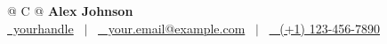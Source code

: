 
\begin{tabularx}{\linewidth}{@{} C @{}}
{\fontsize{32}{38}\selectfont\color{primary}\textbf{Alex Johnson}} \\[10pt]
\href{https://github.com/yourhandle}{\raisebox{-0.05\height}{\Large\faGithub}\ yourhandle} \ {\color{primary}$|$} \ 
\href{mailto:your.email@example.com}{\raisebox{-0.05\height}{\Large\faEnvelope} \ your.email@example.com} \ {\color{primary}$|$} \ 
\href{tel:+11234567890}{\raisebox{-0.05\height}{\Large\faMobile} \ (+1) 123-456-7890} \\[3pt]
\end{tabularx}
